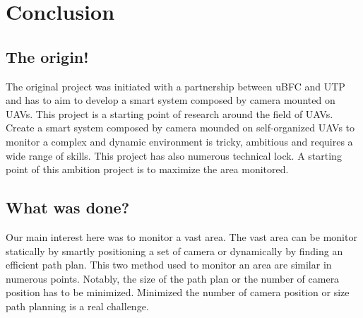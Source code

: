 \chapter{Conclusion}\label{chap:Conclu}

\minitoc



\section{The origin! }
The original project was initiated with a partnership between uBFC and UTP and has to aim to develop a smart system composed by camera mounted on UAVs. This project is a starting point of research around the field of UAVs. Create a smart system composed by camera mounded on self-organized UAVs to monitor a complex and dynamic environment is tricky, ambitious and requires a wide range of skills. This project has also numerous technical lock. A starting point of this ambition project is to maximize the area monitored. 

\section{What was done?}
Our main interest here was to monitor a vast area. 
The vast area can be monitor statically by smartly positioning a set of camera or dynamically by finding an efficient path plan. This two method used to monitor an area are similar in numerous points. 
Notably, the size of the path plan or the number of camera position has to be minimized. Minimized the number of camera position or size path planning is a real challenge. 


%


